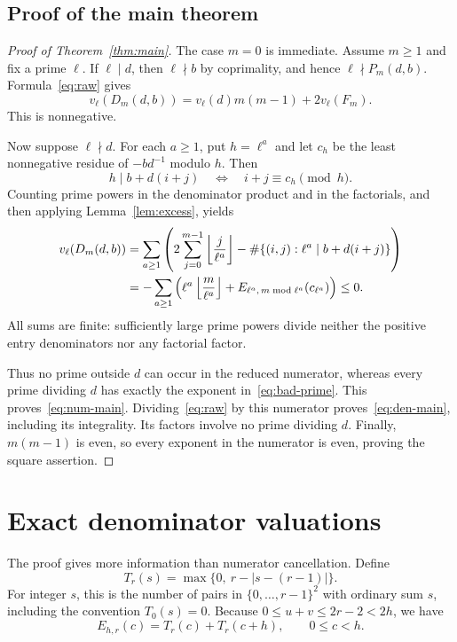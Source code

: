 \documentclass[11pt,a4paper]{article}
\theoremstyle{definition}
\theoremstyle{remark}
\newcommand{\sfac}{F}
\newcommand{\floor}[1]{\left\lfloor #1\right\rfloor}
\begin{document}
\subsection{Proof of the main theorem}
\begin{proof}[Proof of Theorem~\ref{thm:main}]
The case $m=0$ is immediate. Assume $m\ge1$ and fix a prime $\ell$.
If $\ell\mid d$, then $\ell\nmid b$ by coprimality, and hence
$\ell\nmid P_m(d,b)$. Formula~\eqref{eq:raw} gives
\begin{equation}
 v_\ell(D_m(d,b))=v_\ell(d)m(m-1)+2v_\ell(\sfac_m).
 \label{eq:bad-prime}
\end{equation}
This is nonnegative.

Now suppose $\ell\nmid d$. For each $a\ge1$, put $h=\ell^a$ and let
$c_h$ be the least nonnegative residue of $-b d^{-1}$ modulo $h$.
Then
\[
 h\mid b+d(i+j)\quad\Longleftrightarrow\quad i+j\equiv c_h\pmod h.
\]
Counting prime powers in the denominator product and in the factorials,
and then applying Lemma~\ref{lem:excess}, yields
\begin{align}
 v_\ell(D_m(d,b))
 &=\sum_{a\ge1}\left(
 2\sum_{j=0}^{m-1}\floor{\frac j{\ell^a}}
 -\#\{(i,j):\ell^a\mid b+d(i+j)\}\right)\notag\\
 &=-\sum_{a\ge1}\left(
 \ell^a\floor{\frac m{\ell^a}}
 +E_{\ell^a,\,m\bmod\ell^a}(c_{\ell^a})\right)
 \le0.
 \label{eq:good-prime}
\end{align}
All sums are finite: sufficiently large prime powers divide neither the
positive entry denominators nor any factorial factor.

Thus no prime outside $d$ can occur in the reduced numerator, whereas every
prime dividing $d$ has exactly the exponent in~\eqref{eq:bad-prime}.
This proves~\eqref{eq:num-main}. Dividing~\eqref{eq:raw} by this numerator
proves~\eqref{eq:den-main}, including its integrality. Its factors involve
no prime dividing $d$. Finally, $m(m-1)$ is even, so every exponent in the
numerator is even, proving the square assertion.
\end{proof}

\section{Exact denominator valuations}
\label{sec:den}

The proof gives more information than numerator cancellation. Define
\[
 T_r(s)=\max\{0,\ r-|s-(r-1)|\}.
\]
For integer $s$, this is the number of pairs in $\{0,\ldots,r-1\}^2$
with ordinary sum $s$, including the convention $T_0(s)=0$.
Because $0\le u+v\le2r-2<2h$, we have
\begin{equation}
 E_{h,r}(c)=T_r(c)+T_r(c+h),\qquad 0\le c<h.
 \label{eq:triangle}
\end{equation}
\end{document}
